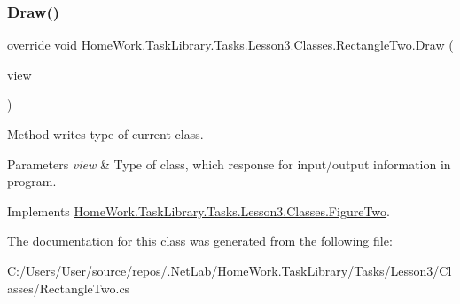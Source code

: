 \subsubsection{\texorpdfstring{Draw()}{Draw()}}
{\footnotesize\ttfamily override void Home\+Work.\+Task\+Library.\+Tasks.\+Lesson3.\+Classes.\+Rectangle\+Two.\+Draw (\begin{DoxyParamCaption}\item[{I\+Information}]{view }\end{DoxyParamCaption})\hspace{0.3cm}{\ttfamily [virtual]}}



Method writes type of current class. 


\begin{DoxyParams}{Parameters}
{\em view} & Type of class, which response for input/output information in program.\\
\hline
\end{DoxyParams}


Implements \mbox{\hyperlink{class_home_work_1_1_task_library_1_1_tasks_1_1_lesson3_1_1_classes_1_1_figure_two_a9588ffcda1d6b5778e4670bb48c7060b}{Home\+Work.\+Task\+Library.\+Tasks.\+Lesson3.\+Classes.\+Figure\+Two}}.



The documentation for this class was generated from the following file\+:\begin{DoxyCompactItemize}
\item 
C\+:/\+Users/\+User/source/repos/.\+Net\+Lab/\+Home\+Work.\+Task\+Library/\+Tasks/\+Lesson3/\+Classes/Rectangle\+Two.\+cs\end{DoxyCompactItemize}
